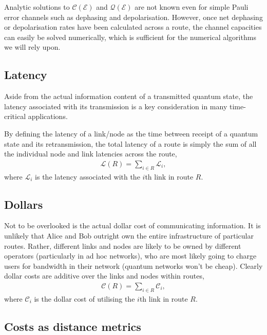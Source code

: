 \documentclass[aps,rmp,twocolumn,amsmath,amssymb,nofootinbib,superscriptaddress]{revtex4}
\begin{document}
Analytic solutions to $\mathcal{C}(\mathcal{E})$ and $\mathcal{Q}(\mathcal{E})$ are not known even for simple Pauli error channels such as dephasing and depolarisation. However, once net dephasing or depolarisation rates have been calculated across a route, the channel capacities can easily be solved numerically, which is sufficient for the numerical algorithms we will rely upon.

%
%

\subsection{Latency} \label{sec:latency_metric}

Aside from the actual information content of a transmitted quantum state, the latency associated with its transmission is a key consideration in many time-critical applications.

By defining the latency of a link/node as the time between receipt of a quantum state and its retransmission, the total latency of a route is simply the sum of all the individual node and link latencies across the route,
\begin{align}
\mathcal{L}(R) = \sum_{i\in R} \mathcal{L}_i,
\end{align}
where $\mathcal{L}_i$ is the latency associated with the $i$th link in route $R$.

%
%

\subsection{Dollars} \label{sec:dollars}

Not to be overlooked is the actual dollar cost of communicating information. It is unlikely that Alice and Bob outright own the entire infrastructure of particular routes. Rather, different links and nodes are likely to be owned by different operators (particularly in ad hoc networks), who are most likely going to charge users for bandwidth in their network (quantum networks won't be cheap). Clearly dollar costs are additive over the links and nodes within routes,
\begin{align}
\mathcal{C}(R) = \sum_{i\in R} \mathcal{C}_i,
\end{align}
where $\mathcal{C}_i$ is the dollar cost of utilising the $i$th link in route $R$.

%
%

\subsection{Costs as distance metrics} \label{sec:cost_as_dist}
\end{document}
